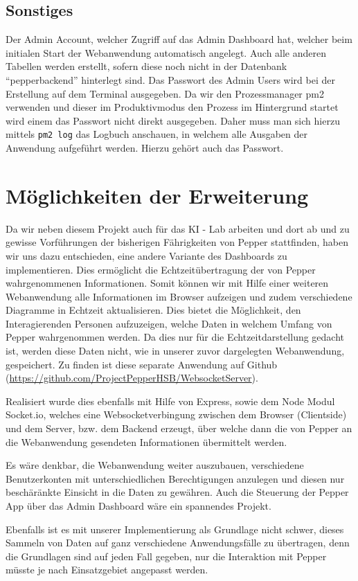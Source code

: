\subsection*{Sonstiges}
\label{sec:nodechapter-install-other}
Der Admin Account, welcher Zugriff auf das Admin Dashboard hat, welcher beim initialen Start der Webanwendung automatisch angelegt. Auch alle anderen Tabellen werden erstellt, sofern diese noch nicht in der Datenbank ``pepperbackend'' hinterlegt sind. Das Passwort des Admin Users wird bei der Erstellung auf dem Terminal ausgegeben. Da wir den Prozessmanager pm2 verwenden und dieser im Produktivmodus den Prozess im Hintergrund startet wird einem das Passwort nicht direkt ausgegeben. Daher muss man sich hierzu mittels \verb|pm2 log| das Logbuch anschauen, in welchem alle Ausgaben der Anwendung aufgeführt werden. Hierzu gehört auch das Passwort.\\


\section{Möglichkeiten der Erweiterung}
Da wir neben diesem Projekt auch für das KI - Lab arbeiten und dort ab und zu gewisse Vorführungen der bisherigen Fährigkeiten von Pepper stattfinden, haben wir uns dazu entschieden, eine andere Variante des Dashboards zu implementieren. Dies ermöglicht die
Echtzeitübertragung der von Pepper wahrgenommenen Informationen. Somit können wir mit Hilfe einer weiteren Webanwendung alle Informationen im Browser aufzeigen und zudem verschiedene Diagramme in Echtzeit aktualisieren. Dies bietet die Möglichkeit, den Interagierenden Personen aufzuzeigen, welche Daten in welchem Umfang von Pepper wahrgenommen werden. Da dies nur für die Echtzeitdarstellung gedacht ist, werden diese Daten nicht, wie in unserer zuvor dargelegten Webanwendung, gespeichert. Zu finden ist diese separate Anwendung auf Github (\href{https://github.com/ProjectPepperHSB/WebsocketServer}{https://github.com/ProjectPepperHSB/WebsocketServer}).

Realisiert wurde dies ebenfalls mit Hilfe von Express, sowie dem Node Modul Socket.io, welches eine Websocketverbingung zwischen dem Browser (Clientside) und dem Server, bzw. dem Backend erzeugt, über welche dann die von Pepper an die Webanwendung gesendeten Informationen übermittelt werden.

Es wäre denkbar, die Webanwendung weiter auszubauen, verschiedene Benutzerkonten mit unterschiedlichen Berechtigungen anzulegen und diesen nur beschäränkte Einsicht in die Daten zu gewähren. Auch die Steuerung der Pepper App über das Admin Dashboard wäre ein spannendes Projekt.

Ebenfalls ist es mit unserer Implementierung als Grundlage nicht schwer, dieses Sammeln von Daten auf ganz verschiedene Anwendungsfälle zu übertragen, denn die Grundlagen sind auf jeden Fall gegeben, nur die Interaktion mit Pepper müsste je nach Einsatzgebiet angepasst werden.
